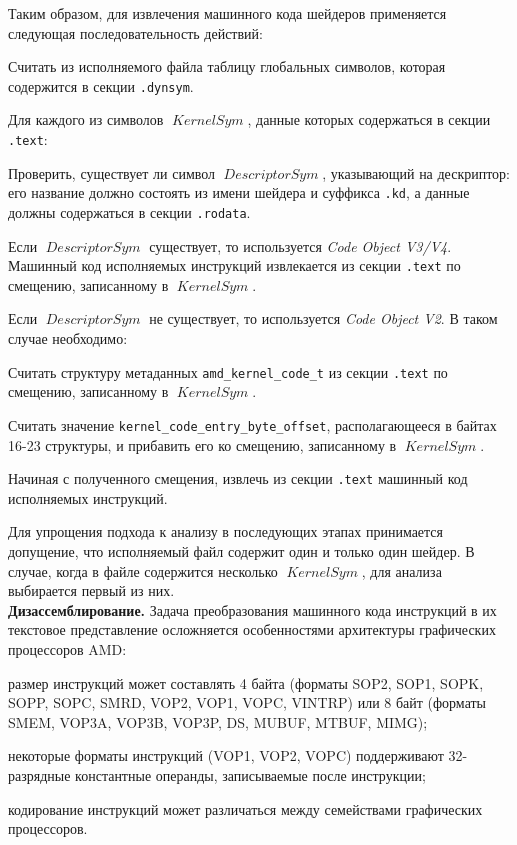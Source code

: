 \documentclass[a4paper,14pt]{extarticle}
\newcommand{\topic}[1]{\textbf{#1.}}
\newcommand{\var}[1]{\mathop{\mathit{#1}}}
\begin{document}
{Таким образом, для извлечения машинного кода шейдеров применяется следующая последовательность действий:
\begin{ol}
\item Считать из исполняемого файла таблицу глобальных символов, которая содержится в секции \verb|.dynsym|.
\item Для каждого из символов $\var{KernelSym}$, данные которых содержаться в секции \verb|.text|:
  \begin{ol}
  \item Проверить, существует ли символ $\var{DescriptorSym}$, указывающий на дескриптор: его название должно состоять
    из имени шейдера и суффикса \verb|.kd|, а данные должны содержаться в секции \verb|.rodata|.
  \item Если $\var{DescriptorSym}$ существует, то используется \textit{Code Object V3/V4}. Машинный код исполняемых
    инструкций извлекается из секции \verb|.text| по смещению, записанному в $\var{KernelSym}$.
  \item Если $\var{DescriptorSym}$ не существует, то используется \textit{Code Object V2}. В таком случае необходимо:
    \begin{ul}
    \item Считать структуру метаданных \verb|amd_kernel_code_t| \cite{amdgpu-abi}
      из секции \verb|.text| по смещению, записанному в $\var{KernelSym}$.
    \item Считать значение \verb|kernel_code_entry_byte_offset|, располагающееся в байтах 16-23 структуры,
      и прибавить его ко смещению, записанному в $\var{KernelSym}$.
    \item Начиная с полученного смещения, извлечь из секции \verb|.text| машинный код исполняемых инструкций.
    \end{ul}
  \end{ol}
\end{ol}

Для упрощения подхода к анализу в последующих этапах принимается допущение,
что исполняемый файл содержит один и только один шейдер. В случае, когда в файле содержится несколько
$\var{KernelSym}$, для анализа выбирается первый из них.\\

\topic{Дизассемблирование} Задача преобразования машинного кода инструкций в их текстовое представление
осложняется особенностями архитектуры графических процессоров AMD:
\begin{ul}
\item размер инструкций может составлять 4 байта (форматы SOP2, SOP1, SOPK, SOPP, SOPC, SMRD, VOP2, VOP1, VOPC, VINTRP)
  или 8 байт (форматы SMEM, VOP3A, VOP3B, VOP3P, DS, MUBUF, MTBUF, MIMG);
\item некоторые форматы инструкций (VOP1, VOP2, VOPC) поддерживают 32-разрядные константные операнды,
  записываемые после инструкции;
\item кодирование инструкций может различаться между семействами графических процессоров.
\end{ul}

}
\end{document}
